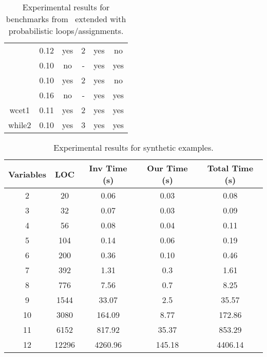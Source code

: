 \begin{center}
\begin{table}[]
\begin{tabular}{c|c|c|c|c|c}
{\multirow{2}{*}{speedSingleSingle2}} & {0.12} & {yes} & {2} & {yes} & {no} \\\cline{2-6}
{} & {0.10} & {no} & {-} & {yes} & {yes} \\\hline
{\multirow{2}{*}{unperfect}} & {0.10} & {yes} & {2} & {yes} & {no} \\\cline{2-6}
{} & {0.16} & {no} & {-} & {yes} & {yes} \\\hline
{wcet1} & {0.11} & {yes} & {2} & {yes} & {yes} \\\hline
{while2} & {0.10} & {yes} & {3} & {yes} & {yes} \\\hline
    
\end{tabular}
\caption{Experimental results for benchmarks from~\cite{ADFG10:lexicographic} extended with probabilistic loops/assignments.} \label{tab:exp1}
\vspace{-1em}
\end{table}
\end{center}

\begin{center}
\begin{table}[]
  \centering
   \begin{tabular}{c|c|c|c|c}

{Variables} & {LOC} & {Inv Time (s)} & {Our Time (s)} & {Total Time (s)} \\\hline \hline
{2} & {20} & {0.06} & {0.03} & {0.08} \\\hline
{3} & {32} & {0.07} & {0.03} & {0.09} \\\hline
{4} & {56} & {0.08} & {0.04} & {0.11} \\\hline
{5} & {104} & {0.14} & {0.06} & {0.19} \\\hline
{6} & {200} & {0.36} & {0.10} & {0.46} \\\hline
{7} & {392} & {1.31} & {0.3} & {1.61} \\\hline
{8} & {776} & {7.56} & {0.7} & {8.25} \\\hline
{9} & {1544} & {33.07} & {2.5} & {35.57} \\\hline
{10} & {3080} & {164.09} & {8.77} & {172.86} \\\hline
{11} & {6152} & {817.92} & {35.37} & {853.29} \\\hline
{12} & {12296} & {4260.96} & {145.18} & {4406.14} \\\hline
\end{tabular}
\caption{Experimental results for synthetic examples.}\label{tab:exp2}
\vspace{-1em}
\end{table}
\end{center}
